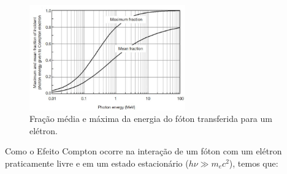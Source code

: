 \documentclass[11pt,a4paper]{article}
\begin{document}
\begin{enumerate}
                        \begin{figure}[h]
                            \centering
                            \includegraphics[width=0.6\textwidth]{Imagens/maximoEMediaFracaoEletronCompton.JPG}
                            \caption{Fração média e máxima da energia do fóton transferida para um elétron.}
                            \label{fig:maximoEMediaFracaoEletronCompton}
                        \end{figure}
                \end{enumerate}

                Como o Efeito Compton ocorre na interação de um fóton com um elétron praticamente livre e em um estado estacionário ($h\nu \gg m_e c^2$), temos que:
\end{document}
